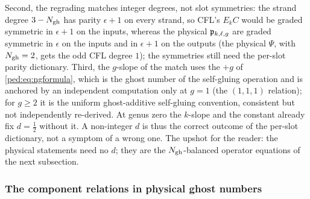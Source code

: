 Second, the regrading matches integer degrees, not slot symmetries: the strand degree $3-N_{\text{gh}}$ has parity $\epsilon+1$ on every strand, so CFL's $E_kC$ would be graded symmetric in $\epsilon+1$ on the inputs, whereas the physical $\mathfrak{p}_{k,\ell,g}$ are graded symmetric in $\epsilon$ on the inputs and in $\epsilon+1$ on the outputs (the physical $\Psi$, with $N_{\text{gh}}=2$, gets the odd CFL degree $1$); the symmetries still need the per-slot parity dictionary.
Third, the $g$-slope of the match uses the $+g$ of \eqref{ped:eq:ngformula}, which is the ghost number of the self-gluing operation and is anchored by an independent computation only at $g=1$ (the $(1,1,1)$ relation); for $g\ge2$ it is the uniform ghost-additive self-gluing convention, consistent but not independently re-derived.
At genus zero the $k$-slope and the constant already fix $d=\tfrac12$ without it.
A non-integer $d$ is thus the correct outcome of the per-slot dictionary, not a symptom of a wrong one.
The upshot for the reader: the physical statements need no $d$; they are the $N_{\text{gh}}$-balanced
operator equations of the next subsection.

\subsubsection{The component relations in physical ghost numbers}
\label{ped:sec:grading:rels}

